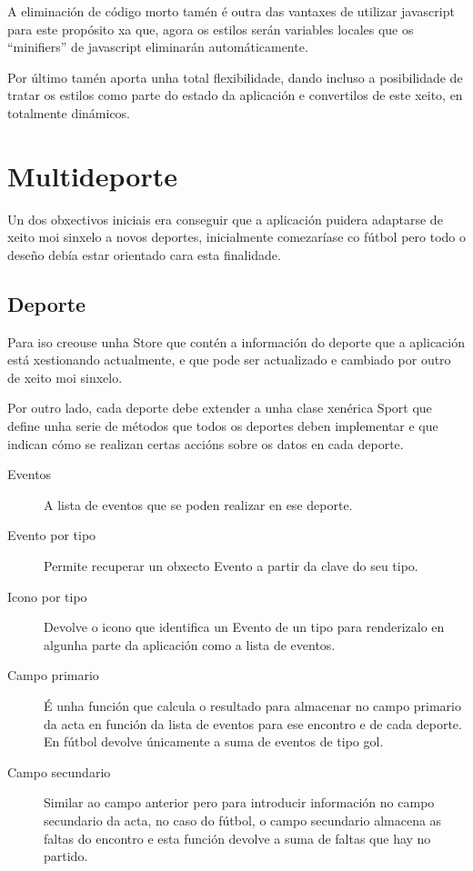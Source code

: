     A eliminación de código morto tamén é outra das vantaxes de utilizar 
javascript para este propósito xa que, agora os estilos serán variables locales 
que os ``minifiers'' de javascript eliminarán automáticamente.

    Por último tamén aporta unha total flexibilidade, dando incluso a 
posibilidade de tratar os estilos como parte do estado da aplicación e 
convertilos de este xeito, en totalmente dinámicos.

  \section{Multideporte}
  Un dos obxectivos iniciais era conseguir que a aplicación puidera adaptarse 
de xeito moi sinxelo a novos deportes, inicialmente comezaríase co fútbol pero 
todo o deseño debía estar orientado cara esta finalidade.

  \subsection{Deporte}
  Para iso creouse unha Store que contén a información do deporte que a 
aplicación está xestionando actualmente, e que pode ser actualizado e cambiado 
por outro de xeito moi sinxelo.

  Por outro lado, cada deporte debe extender a unha clase xenérica Sport que 
define unha serie de métodos que todos os deportes deben implementar e que 
indican cómo se realizan certas accións sobre os datos en cada deporte.

  \begin{description}
   \item [Eventos] A lista de eventos que se poden realizar en ese deporte.
   \item [Evento por tipo] Permite recuperar un obxecto Evento a partir da 
clave do seu tipo.
   \item [Icono por tipo] Devolve o icono que identifica un Evento de un 
tipo para renderizalo en algunha parte da aplicación como a lista de eventos.
   \item [Campo primario] É unha función que calcula o resultado para 
almacenar no campo primario da acta en función da lista de eventos para ese 
encontro e de cada deporte. En fútbol devolve únicamente a suma de eventos de 
tipo gol.
   \item [Campo secundario] Similar ao campo anterior pero para introducir 
información no campo secundario da acta, no caso do fútbol, o campo secundario 
almacena as faltas do encontro e esta función devolve a suma de faltas que hay 
no partido.
  \end{description}

